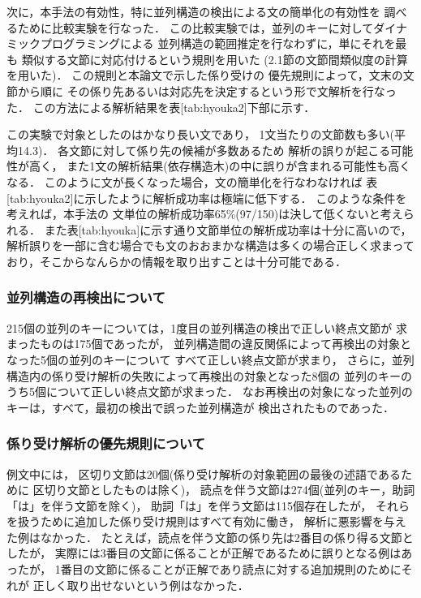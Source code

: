 次に，本手法の有効性，特に並列構造の検出による文の簡単化の有効性を
調べるために比較実験を行なった．
この比較実験では，並列のキーに対してダイナミックプログラミングによる
並列構造の範囲推定を行なわずに，単にそれを最も
類似する文節に対応付けるという規則を用いた
(2.1節の文節間類似度の計算を用いた)．
この規則と本論文で示した係り受けの
優先規則によって，文末の文節から順に
その係り先あるいは対応先を決定するという形で文解析を行なった．
この方法による解析結果を表[tab:hyouka2]下部に示す．

この実験で対象としたのはかなり長い文であり，
1文当たりの文節数も多い(平均14.3)．
各文節に対して係り先の候補が多数あるため
解析の誤りが起こる可能性が高く，
また1文の解析結果(依存構造木)の中に誤りが含まれる可能性も高くなる．
このように文が長くなった場合，文の簡単化を行なわなければ
表[tab:hyouka2]に示したように解析成功率は極端に低下する．
このような条件を考えれば，本手法の
文単位の解析成功率65\%(97/150)は決して低くないと考えられる．
また表[tab:hyouka]に示す通り文節単位の解析成功率は十分に高いので，
解析誤りを一部に含む場合でも文のおおまかな構造は多くの場合正しく求まって
おり，そこからなんらかの情報を取り出すことは十分可能である．

\subsubsection*{並列構造の再検出について}

215個の並列のキーについては，1度目の並列構造の検出で正しい終点文節が
求まったものは175個であったが，
並列構造間の違反関係によって再検出の対象となった5個の並列のキーについて
すべて正しい終点文節が求まり，
さらに，並列構造内の係り受け解析の失敗によって再検出の対象となった8個の
並列のキーのうち5個について正しい終点文節が求まった．
なお再検出の対象になった並列のキーは，すべて，最初の検出で誤った並列構造が
検出されたものであった．

\subsubsection*{係り受け解析の優先規則について}

例文中には，
区切り文節は20個(係り受け解析の対象範囲の最後の述語であるために
区切り文節としたものは除く)，
読点を伴う文節は274個(並列のキー，助詞「は」を伴う文節を除く)，
助詞「は」を伴う文節は115個存在したが，
それらを扱うために追加した係り受け規則はすべて有効に働き，
解析に悪影響を与えた例はなかった．
たとえば，読点を伴う文節の係り先は2番目の係り得る文節としたが，
実際には3番目の文節に係ることが正解であるために誤りとなる例はあったが，
1番目の文節に係ることが正解であり読点に対する追加規則のためにそれが
正しく取り出せないという例はなかった．

